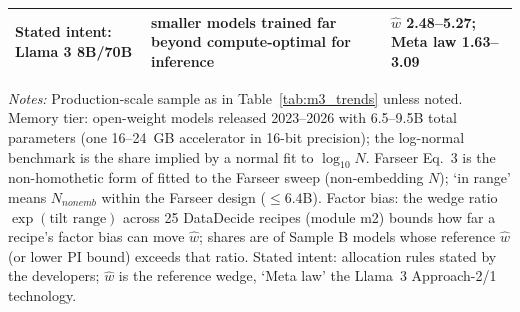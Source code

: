 \begin{table}[htbp]
\begin{threeparttable}
\begin{tabular}{@{}p{3.6cm}p{6.2cm}p{4.6cm}@{}}
Stated intent: Llama 3 8B/70B & smaller models trained far beyond compute-optimal for inference \citep{grattafiori2024llama} & $\hat w$ 2.48--5.27; Meta law 1.63--3.09 \\
\bottomrule
\end{tabular}
\begin{tablenotes}\footnotesize
\item \textit{Notes:} Production-scale sample as in Table~\ref{tab:m3_trends} unless noted. Memory tier: open-weight models released 2023--2026 with 6.5--9.5B total parameters (one 16--24~GB accelerator in 16-bit precision); the log-normal benchmark is the share implied by a normal fit to $\log_{10}N$. Farseer Eq.~3 is the non-homothetic form of \citet{li2025predictableb} fitted to the Farseer sweep (non-embedding $N$); `in range' means $N_{nonemb}$ within the Farseer design ($\le6.4$B). Factor bias: the wedge ratio $\exp(\text{tilt range})$ across 25 DataDecide recipes (module m2) bounds how far a recipe's factor bias can move $\hat w$; shares are of Sample B models whose reference $\hat w$ (or lower PI bound) exceeds that ratio. Stated intent: allocation rules stated by the developers; $\hat w$ is the reference wedge, `Meta law' the Llama~3 Approach-2/1 technology.
\end{tablenotes}
\end{threeparttable}
\end{table}
